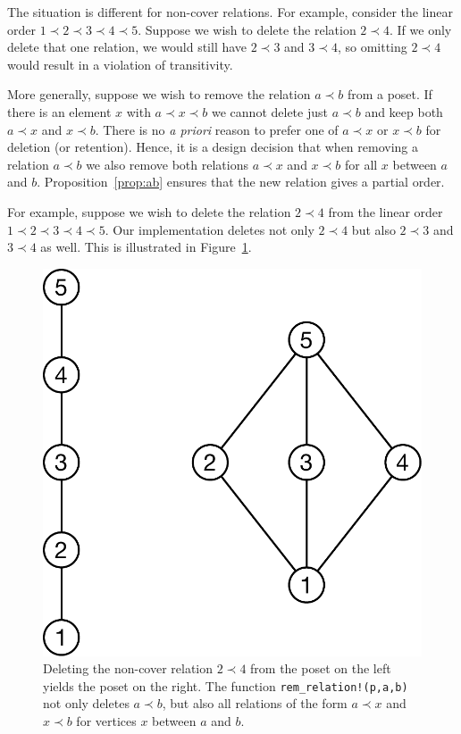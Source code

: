 \documentclass[12pt]{article}
\begin{document}
The situation is different for non-cover relations. For example,
consider the linear order $1\prec2\prec3\prec4\prec5$. Suppose we
wish to delete the relation $2\prec4$. If we only delete that one
relation, we would still have $2\prec3$ and $3\prec4$, so omitting
$2\prec4$ would result in a violation of transitivity. 

More generally, suppose we wish to remove the relation $a\prec b$ from
a poset. If there is an element $x$ with $a\prec x\prec b$ we cannot
delete just $a\prec b$ and keep both $a \prec x$ and $x\prec b$. There
is no \emph{a priori} reason to prefer one of $a\prec x$ or $x \prec
b$ for deletion (or retention). Hence, it is a design decision that
when removing a relation $a \prec b$ we also remove both relations $a
\prec x$ and $x \prec b$ for all $x$ between $a$ and
$b$. Proposition~\ref{prop:ab} ensures that the new relation gives a
partial order. 

For example, suppose we wish to delete the relation $2\prec4$ from the
linear order $1 \prec 2 \prec 3 \prec 4 \prec 5$. Our implementation
deletes not only $2\prec 4$ but also $2\prec3$ and $3\prec4$ as well. 
This is illustrated in Figure~\ref{fig:other-edge-deletion}. 
\begin{figure}[h]
  \begin{framed}
    \begin{center}
      \includegraphics[scale=0.3]{other-edge-deletion}
    \end{center}
    \caption{Deleting the non-cover relation $2\prec4$ from the poset
      on the left yields the poset on the right.  The function
      \texttt{rem\_relation!(p,a,b)} not only deletes $a\prec b$, but
      also all relations of the form $a\prec x$ and $x\prec b$ for
      vertices $x$ between $a$ and $b$.}
    \label{fig:other-edge-deletion}
  \end{framed}
\end{figure}
\end{document}
